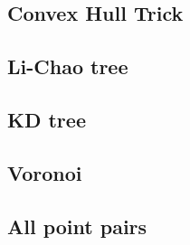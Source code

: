 \subsection{Convex Hull Trick}


\subsection{Li-Chao tree}


\newpage
\subsection{KD tree}


\newpage
\subsection{Voronoi}


\subsection{All point pairs}


